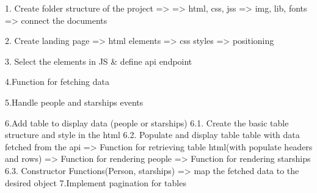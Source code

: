 1. Create folder structure of the project =>
        => html, css, jss
        => img, lib, fonts
        => connect the documents

2. Create landing page
        => html elements
        => css styles
        => positioning

3. Select the elements in JS & define api endpoint

4.Function for fetching data

5.Handle people and starships events

6.Add table to display data (people or starships)
        6.1. Create the basic table structure and style in the html
        6.2. Populate and display table table with data fetched from the api    
                => Function for retrieving table html(with populate headers and rows)
                => Function for rendering people
                => Function for rendering starships
        6.3. Constructor Functions(Person, starships)
                => map the fetched data to the desired object
7.Implement pagination for tables